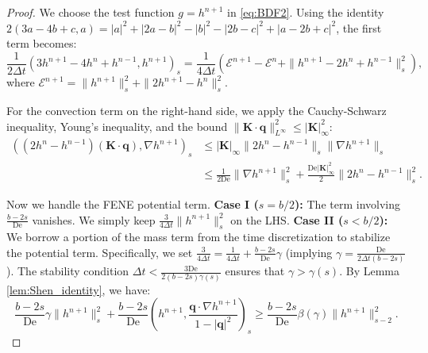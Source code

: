 \documentclass[preprint,12pt]{elsarticle}
\begin{document}
\begin{proof}
We choose the test function $g = h^{n+1}$ in \eqref{eq:BDF2}. 
Using the identity $2(3a-4b+c, a) = |a|^2 + |2a-b|^2 - |b|^2 - |2b-c|^2 + |a-2b+c|^2$, the first term becomes:
\begin{equation}
    \frac{1}{2\Delta t}\left(3h^{n+1}-4h^{n}+h^{n-1}, h^{n+1}\right)_s = \frac{1}{4\Delta t}\left( \mathcal{E}^{n+1} - \mathcal{E}^n + \|h^{n+1}-2h^n+h^{n-1}\|_s^2 \right),
\end{equation}
where $\mathcal{E}^{n+1} = \|h^{n+1}\|_s^2 + \|2h^{n+1}-h^n\|_s^2$.

For the convection term on the right-hand side, we apply the Cauchy-Schwarz inequality, Young's inequality, and the bound $\|\boldsymbol{K}\cdot\boldsymbol{q}\|_{L^\infty}^2 \le |\boldsymbol{K}|_\infty^2$:
\begin{equation}
\begin{aligned}
    \left( (2h^n - h^{n-1}) (\bm{K}\cdot \bm{q}), \nabla h^{n+1} \right)_s 
    &\le |\boldsymbol{K}|_\infty \|2h^n - h^{n-1}\|_s \|\nabla h^{n+1}\|_s \\
    &\le \frac{1}{2\text{De}} \|\nabla h^{n+1}\|_s^2 + \frac{\text{De}|\boldsymbol{K}|_\infty^2}{2} \|2h^n - h^{n-1}\|_s^2.
\end{aligned}
\end{equation}

Now we handle the FENE potential term.
\textbf{Case I ($s=b/2$):} The term involving $\frac{b-2s}{\text{De}}$ vanishes. We simply keep $\frac{3}{4\Delta t}\|h^{n+1}\|_s^2$ on the LHS.
\textbf{Case II ($s<b/2$):} We borrow a portion of the mass term from the time discretization to stabilize the potential term. Specifically, we set $\frac{3}{4\Delta t} = \frac{1}{4\Delta t} + \frac{b-2s}{\text{De}}\gamma$ (implying $\gamma = \frac{\text{De}}{2\Delta t(b-2s)}$). The stability condition $\Delta t < \frac{3\text{De}}{2(b-2s)\gamma(s)}$ ensures that $\gamma > \gamma(s)$. By Lemma \ref{lem:Shen_identity}, we have:
\begin{equation}
    \frac{b-2s}{\text{De}}\gamma \|h^{n+1}\|_s^2 + \frac{b-2s}{\text{De}}\left(h^{n+1}, \frac{\bm{q}\cdot \nabla h^{n+1}}{1-|\bm{q}|^2}\right)_s \ge  \frac{b-2s}{\text{De}}\beta(\gamma)\|h^{n+1}\|_{s-2}^2.
\end{equation}


\end{proof}
\end{document}
